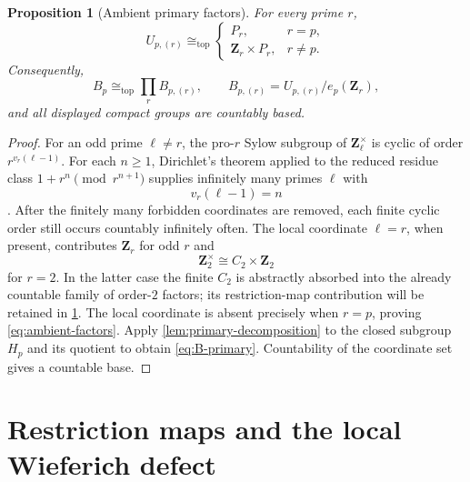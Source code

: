 \documentclass[11pt]{article}
\newtheorem{proposition}[theorem]{Proposition}
\theoremstyle{definition}
\newcommand{\TopIso}{\cong_{\mathrm{top}}}
\begin{document}
\begin{proposition}[Ambient primary factors]\label{prop:ambient-factors}
For every prime $r$,
\begin{equation}\label{eq:ambient-factors}
U_{p,(r)}\TopIso
\begin{cases}
P_r,&r=p,\\
\mathbf Z_r\times P_r,&r\ne p.
\end{cases}
\end{equation}
Consequently,
\begin{equation}\label{eq:B-primary}
B_p\TopIso\prod_rB_{p,(r)},
\qquad
B_{p,(r)}=U_{p,(r)}/e_p(\mathbf Z_r),
\end{equation}
and all displayed compact groups are countably based.
\end{proposition}

\begin{proof}
For an odd prime $\ell\ne r$, the pro-$r$ Sylow subgroup of
$\mathbf Z_\ell^\times$ is cyclic of order $r^{v_r(\ell-1)}$.  For each
$n\ge1$, Dirichlet's theorem applied to the reduced residue class
$1+r^n\pmod{r^{n+1}}$ supplies infinitely many primes $\ell$ with
\begin{equation}\label{eq:dirichlet-valuation}
v_r(\ell-1)=n
\end{equation}
\citep[Theorem~18.1]{Sutherland2021Dirichlet}.
After the finitely many forbidden coordinates are removed, each finite cyclic
order still occurs countably infinitely often.  The local coordinate
$\ell=r$, when present, contributes $\mathbf Z_r$ for odd $r$ and
\begin{equation}\label{eq:two-units}
\mathbf Z_2^\times\cong C_2\times\mathbf Z_2
\end{equation}
for $r=2$.  In the latter case the finite $C_2$ is abstractly absorbed into
the already countable family of order-$2$ factors; its restriction-map
contribution will be retained in \cref{sec:restriction}.  The local coordinate
is absent precisely when $r=p$, proving \eqref{eq:ambient-factors}.  Apply
\cref{lem:primary-decomposition} to the closed subgroup $H_p$ and its quotient
to obtain \eqref{eq:B-primary}.  Countability of the coordinate set gives a
countable base.
\end{proof}

\section{Restriction maps and the local Wieferich defect}\label{sec:restriction}
\end{document}
